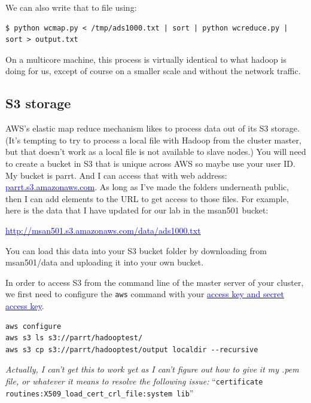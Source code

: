 \begin{fullwidth}
\noindent We can also write that to file using:

\begin{lstlisting}[style=BashInputStyle]
$ python wcmap.py < /tmp/ads1000.txt | sort | python wcreduce.py | sort > output.txt
\end{lstlisting}

\noindent On a multicore machine, this process is virtually identical to what hadoop is doing for us, except of course on a smaller scale and without the network traffic.

\subsection{S3 storage}

AWS's elastic map reduce mechanism likes to process data out of its S3 storage. (It's tempting to try to process a local file with Hadoop from the cluster master, but that doesn't work as a local file is not available to slave nodes.) You will need to create a bucket in S3 that is unique across AWS so maybe use your user ID. My bucket is parrt. And I can access that with web address: \href{https://parrt.s3.amazonaws.com}{\textcolor{blue}{parrt.s3.amazonaws.com}}. As long as I've made the folders underneath public, then I can add elements to the URL to get access to those files. For example, here is the data that I have updated for our lab in the msan501 bucket:

\href{http://msan501.s3.amazonaws.com/data/ads1000.txt}{\textcolor{blue}{http://msan501.s3.amazonaws.com/data/ads1000.txt}}

You can load this data into your S3 bucket folder by downloading from msan501/data and uploading it into your own bucket.

In order to access S3 from the command line of the master server of your cluster, we first need to configure the {\tt aws} command with your \href{http://docs.aws.amazon.com/AWSSimpleQueueService/latest/SQSGettingStartedGuide/AWSCredentials.html}{\textcolor{blue}{access key and secret access key}}.

\begin{lstlisting}[style=BashInputStyle]
aws configure 
aws s3 ls s3://parrt/hadooptest/
aws s3 cp s3://parrt/hadooptest/output localdir --recursive
\end{lstlisting}

{\em Actually,  I can't get this to work yet as I can't figure out how to give it my .pem file, or whatever it means to resolve the following issue:} ``{\tt\small certificate routines:X509\_load\_cert\_crl\_file:system lib}''


\end{fullwidth}
